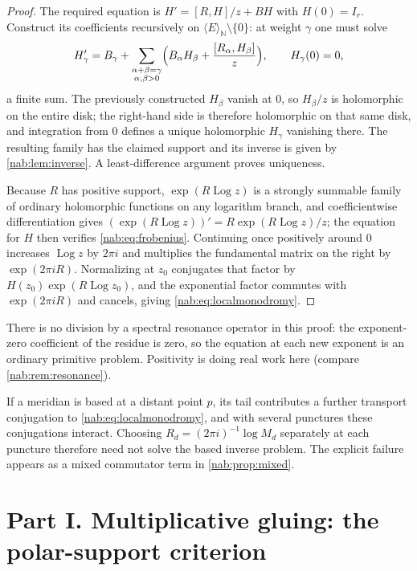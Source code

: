 \documentclass[11pt,letterpaper]{article}
\theoremstyle{definition}
\theoremstyle{remark}
\newcommand{\N}{\mathbb N}
\newcommand{\Log}{\operatorname{Log}}
\newcommand{\angles}[1]{\langle #1\rangle_{\N}}
\numberwithin{equation}{section}
\begin{document}
\begin{proof}
The required equation is $H'=[R,H]/z+BH$ with $H(0)=I_r$. Construct its
coefficients recursively on $\angles E\setminus\{0\}$: at weight $\gamma$ one
must solve
\[
 H_\gamma'=B_\gamma+
 \sum_{\substack{\alpha+\beta=\gamma\\ \alpha,\beta>0}}
  \Bigl(B_\alpha H_\beta+\frac{[R_\alpha,H_\beta]}{z}\Bigr),
 \qquad H_\gamma(0)=0,
\]
a finite sum. The previously constructed $H_\beta$ vanish at $0$, so
$H_\beta/z$ is holomorphic on the entire disk; the right-hand side is
therefore holomorphic on that same disk, and integration from $0$ defines a
unique holomorphic $H_\gamma$ vanishing there. The resulting family has the
claimed support and its inverse is given by \cref{nab:lem:inverse}. A
least-difference argument proves uniqueness.

Because $R$ has positive support, $\exp(R\Log z)$ is a strongly summable
family of ordinary holomorphic functions on any logarithm branch, and
coefficientwise differentiation gives
$(\exp(R\Log z))'=R\exp(R\Log z)/z$; the equation for $H$ then verifies
\eqref{nab:eq:frobenius}. Continuing once positively around $0$ increases
$\Log z$ by $2\pi i$ and multiplies the fundamental matrix on the right by
$\exp(2\pi iR)$. Normalizing at $z_0$ conjugates that factor by
$H(z_0)\exp(R\Log z_0)$, and the exponential factor commutes with
$\exp(2\pi iR)$ and cancels, giving \eqref{nab:eq:localmonodromy}.
\end{proof}

There is no division by a spectral resonance operator in this proof: the
exponent-zero coefficient of the residue is zero, so the equation at each new
exponent is an ordinary primitive problem. Positivity is doing real work here
(compare \cref{nab:rem:resonance}).

If a meridian is based at a distant point $p$, its tail contributes a further
transport conjugation to \eqref{nab:eq:localmonodromy}, and with several
punctures these conjugations interact. Choosing
$R_d=(2\pi i)^{-1}\log M_d$ separately at each puncture therefore need not
solve the based inverse problem. The explicit failure appears as a mixed
commutator term in \cref{nab:prop:mixed}.
\part*{Part I. Multiplicative gluing: the polar-support criterion}
\end{document}
